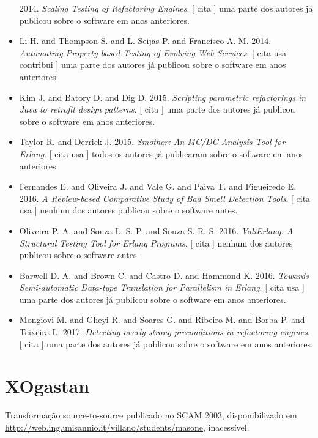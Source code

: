 \begin{itemize}
      2014.
        \textit{ Scaling Testing of Refactoring Engines}.
      [
          cita
      ]
uma parte dos autores já publicou sobre o software em anos anteriores.
\item Li H. and Thompson S. and L. Seijas P. and Francisco A. M.
      2014.
        \textit{ Automating Property-based Testing of Evolving Web Services}.
      [
          cita
          usa
          contribui
      ]
uma parte dos autores já publicou sobre o software em anos anteriores.
\item Kim J. and Batory D. and Dig D.
      2015.
        \textit{ Scripting parametric refactorings in Java to retrofit design patterns}.
      [
          cita
      ]
uma parte dos autores já publicou sobre o software em anos anteriores.
\item Taylor R. and Derrick J.
      2015.
        \textit{ Smother: An MC/DC Analysis Tool for Erlang}.
      [
          cita
          usa
      ]
todos os autores já publicaram sobre o software em anos anteriores.
\item Fernandes E. and Oliveira J. and Vale G. and Paiva T. and Figueiredo E.
      2016.
        \textit{ A Review-based Comparative Study of Bad Smell Detection Tools}.
      [
          cita
          usa
      ]
nenhum dos autores publicou sobre o software antes.
\item Oliveira P. A. and Souza L. S. P. and Souza S. R. S.
      2016.
        \textit{ ValiErlang: A Structural Testing Tool for Erlang Programs}.
      [
          cita
      ]
nenhum dos autores publicou sobre o software antes.
\item Barwell D. A. and Brown C. and Castro D. and Hammond K.
      2016.
        \textit{ Towards Semi-automatic Data-type Translation for Parallelism in Erlang}.
      [
          cita
          usa
      ]
uma parte dos autores já publicou sobre o software em anos anteriores.
\item Mongiovi M. and Gheyi R. and Soares G. and Ribeiro M. and Borba P. and Teixeira L.
      2017.
        \textit{ Detecting overly strong preconditions in refactoring engines}.
      [
          cita
      ]
uma parte dos autores já publicou sobre o software em anos anteriores.
\end{itemize}
\section{XOgastan}

Transformação source-to-source
publicado no SCAM 2003,
disponibilizado em \url{http://web.ing.unisannio.it/villano/students/masone},
inacessível.

